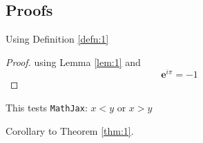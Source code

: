 \subsection{Proofs}

\begin{Lem}\label{lem:1}
  \lipsum[3]
\end{Lem}

\begin{Theorem}\label{thm:1}
  Using Definition \ref{defn:1} \\
  \lipsum[4]
  \begin{proof}
    using Lemma \ref{lem:1} and
    \begin{equation}
      \label{eq:1}
      {\mathbf{e}}^{i \pi }=-1
    \end{equation}
  \end{proof}
  This tests \texttt{MathJax}: $x<y$ or $x>y$
\end{Theorem}

\lipsum[5]

\begin{Cor}\label{cor:1}
  Corollary to Theorem \ref{thm:1}.
  \\
  \lipsum[6]
\end{Cor}
